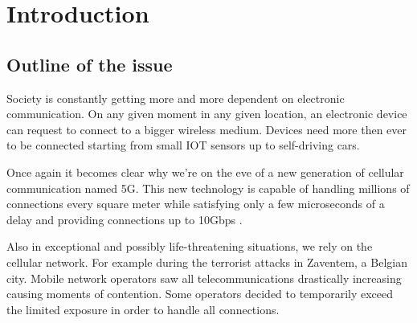 %

\chapter{Introduction}
\label{chap:intro}

\section{Outline of the issue}
\label{sec:issue}

Society is constantly getting more and more dependent on electronic communication. On any given moment in any given location, an electronic device
can request to connect to a bigger wireless medium. Devices need more then ever to be connected starting from small IOT sensors up to self-driving cars.

Once again it becomes clear why we're on the eve of a new generation of cellular communication named 5G. 
This new technology is capable of handling millions of connections every square meter %
while satisfying only a few microseconds of a delay and providing connections up to 10Gbps \cite{5GFeatures}.

Also in exceptional and possibly life-threatening situations, we rely on the cellular network. For example during the terrorist attacks in Zaventem, a Belgian city.
Mobile network operators saw all telecommunications drastically increasing causing moments of contention. Some operators decided to temporarily exceed the limited exposure in
order to handle all connections. \cite{baseZaventem}

